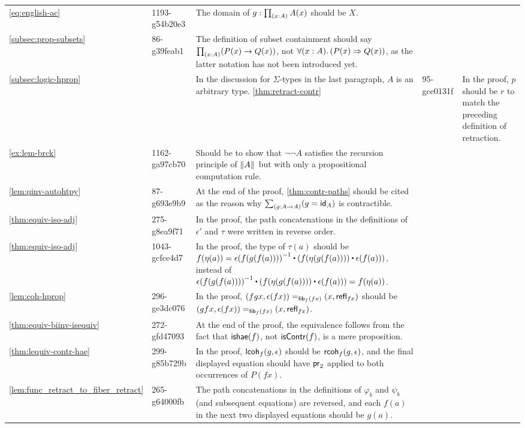 \documentclass[
%
%
11pt %
]{article}
\begin{document}
\begin{longtable}{llp{10.5cm}}
  \cref{eq:english-ac}
  & 1193-g54b20e3
  & The domain of $g:\prd{x:A} A(x)$ should be $X$.\\
  \cref{subsec:prop-subsets}
  & 86-g39feab1
  & The definition of subset containment should say $\prd{x:A}(P(x)\rightarrow Q(x))$, not $\fall{x:A}(P(x)\Rightarrow Q(x))$, as the latter notation has not been introduced yet.\\
  \cref{subsec:logic-hprop}
  & %
  & In the discussion for $\Sigma$-types in the last paragraph, $A$ is an arbitrary type.
  \cref{thm:retract-contr}
  & 95-gce0131f
  & In the proof, $p$ should be $r$ to match the preceding definition of retraction.\\
  \cref{ex:lem-brck}
  & 1162-ga97cb70
  & Should be to show that $\neg\neg A$ satisfies the recursion principle of $\brck{A}$ but with only a propositional computation rule.\\
  \cref{lem:qinv-autohtpy}
  & 87-g693e9b9
  & At the end of the proof, \cref{thm:contr-paths} should be cited as the reason why $\sm{g:A\to A} (g = \idfunc[A])$ is contractible.\\
  \cref{thm:equiv-iso-adj}
  & 275-g8ea9f71
  & In the proof, the path concatenations in the definitions of $\epsilon'$ and $\tau$ were written in reverse order.\\
  \cref{thm:equiv-iso-adj}
  & 1043-gcfce4d7
  & In the proof, the type of $\tau(a)$ should be $\ap{f}{\eta(a)}=\opp{\epsilon(f(g(f(a))))}\ct (\ap{f}{\eta(g(f(a)))}\ct \epsilon(f(a)))$, instead of $\opp{\epsilon(f(g(f(a))))}\ct (\ap{f}{\eta(g(f(a)))}\ct \epsilon(f(a)))=\ap{f}{\eta(a)}$.\\
  \cref{lem:coh-hprop}
  & 296-ge3dc076
  & In the proof, $\id[\hfib{f}{fx}]{(fgx,\epsilon(fx))}{(x,\refl{fx})}$ should be $\id[\hfib{f}{fx}]{(gfx,\epsilon(fx))}{(x,\refl{fx})}$.\\
  \cref{thm:equiv-biinv-isequiv}
  & 272-gfd47093
  & At the end of the proof, the equivalence follows from the fact that $\ishae(f)$, not $\iscontr(f)$, is a mere proposition. \\
  \cref{thm:lequiv-contr-hae}
  & 299-g85b729b
  & In the proof, $\lcoh{f}{g}{\epsilon}$ should be $\rcoh{f}{g}{\epsilon}$, and the final displayed equation should have $\proj{2}$ applied to both occurrences of $P(fx)$.\\
  \cref{lem:func_retract_to_fiber_retract}
  & 265-g64000fb
  & The path concatenations in the definitions of $\varphi_b$ and $\psi_b$ (and subsequent equations) are reversed, and each $f(a)$ in the next two displayed equations should be $g(a)$.\\

\end{longtable}
\end{document}
